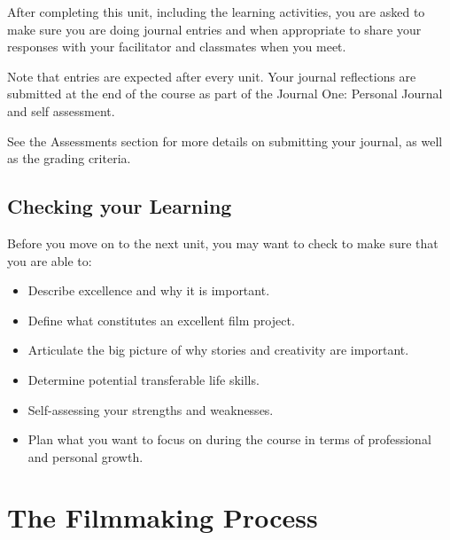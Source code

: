 \documentclass[
]{book}
\providecommand{\tightlist}{%
  \setlength{\itemsep}{0pt}\setlength{\parskip}{0pt}}
\begin{document}
\begin{assessment}
After completing this unit, including the learning activities, you are asked to make sure you are doing journal entries and when appropriate to share your responses with your facilitator and classmates when you meet.

Note that entries are expected after every unit. Your journal reflections are submitted at the end of the course as part of the Journal One: Personal Journal and self assessment.

See the Assessments section for more details on submitting your journal, as well as the grading criteria.
\end{assessment}

\hypertarget{checking-your-learning}{%
\section*{Checking your Learning}\label{checking-your-learning}}

\begin{progress}
Before you move on to the next unit, you may want to check to make sure that you are able to:

\begin{itemize}
\tightlist
\item
  Describe excellence and why it is important.\\
\item
  Define what constitutes an excellent film project.\\
\item
  Articulate the big picture of why stories and creativity are important.\\
\item
  Determine potential transferable life skills.\\
\item
  Self-assessing your strengths and weaknesses.\\
\item
  Plan what you want to focus on during the course in terms of professional and personal growth.
\end{itemize}
\end{progress}

\hypertarget{the-filmmaking-process}{%
\chapter{The Filmmaking Process}\label{the-filmmaking-process}}
\end{document}
